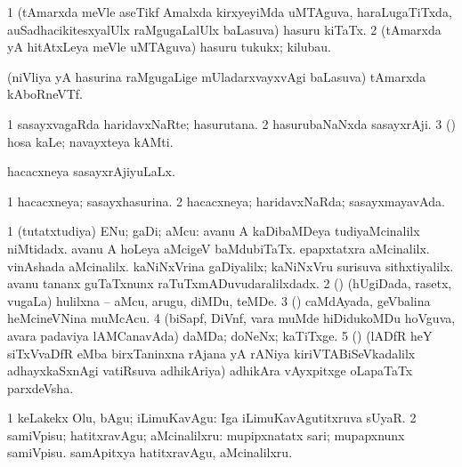 \bentry
{} 
\gl{\nA}
\expl{}
\bmng
\bnum
\num{1} (tAmarxda meVle aseTikf Amalxda kirxyeyiMda uMTAguva, haraLugaTiTxda, auSadhacikitesxyalUlx raMgugaLalUlx baLasuva) hasuru kiTaTx. 
\num{2} (tAmarxda yA hitAtxLeya meVle uMTAguva) hasuru tukukx; kilubau. 
\enum
\emng
\eentry

\bentry
{} 
\gl{\nA}
\expl{}
\bmng
 (niVliya yA hasurina raMgugaLige mUladarxvayxvAgi baLasuva) tAmarxda kAboRneVTf. 
\emng
\eentry

\bentry
{} 
\gl{\nA}
\expl{}
\bmng
\bnum
\num{1} sasayxvagaRda haridavxNaRte; hasurutana. 
\num{2} hasurubaNaNxda sasayxrAji. 
\num{3} (\kAparx) hosa kaLe; navayxteya kAMti. 
\enum
\emng
\eentry

\bentry
{} 
\gl{\gu}
\expl{}
\bmng
 hacacxneya sasayxrAjiyuLaLx. 
\emng
\eentry

\bentry
{} 
\gl{\gu}
\expl{}
\bmng
\bnum
\num{1} hacacxneya; sasayxhasurina. 
\num{2} hacacxneya; haridavxNaRda; sasayxmayavAda. 
\enum
\emng
\eentry

\bentry
{} 
\gl{\nA}
\expl{}
\bmng
\bnum
\num{1} (tutatxtudiya) ENu; gaDi; aMcu:  avanu A kaDibaMDeya tudiyaMcinalilx niMtidadx.  avanu A hoLeya aMcigeV baMdubiTaTx.  epapxtatxra aMcinalilx.  vinAshada aMcinalilx.  kaNiNxVrina gaDiyalilx; kaNiNxVru surisuva sithxtiyalilx.  avanu tananx guTaTxnunx raTuTxmADuvudaralilxdadx. 
\num{2} (\birx) (hUgiDada, rasetx, \mo vugaLa) hulilxna -- aMcu, arugu, diMDu, teMDe. 
\num{3} (\vAshi) caMdAyada, geVbalina heMcineVNina muMcAcu. 
\num{4} (biSapf, DiVnf, \mo vara muMde hiDidukoMDu hoVguva, avara padaviya lAMCanavAda) daMDa; doNeNx; kaTiTxge. 
\num{5} (\ca) (lADfR heY siTxVvaDfR eMba birxTaninxna rAjana yA rANiya kiriVTABiSeVkadalilx adhayxkaSxnAgi vatiRsuva adhikAriya) adhikAra vAyxpitxge oLapaTaTx parxdeVsha. 
\enum
\emng
\eentry

\bentry
{} 
\gl{\akirx}
\expl{}
\bmng
\bnum
\num{1} keLakekx Olu, bAgu; iLimuKavAgu:  Iga iLimuKavAgutitxruva sUyaR. 
\num{2} samiVpisu; hatitxravAgu; aMcinalilxru:  mupipxnatatx sari; mupapxnunx samiVpisu.  samApitxya hatitxravAgu, aMcinalilxru. 
\enum
\emng


